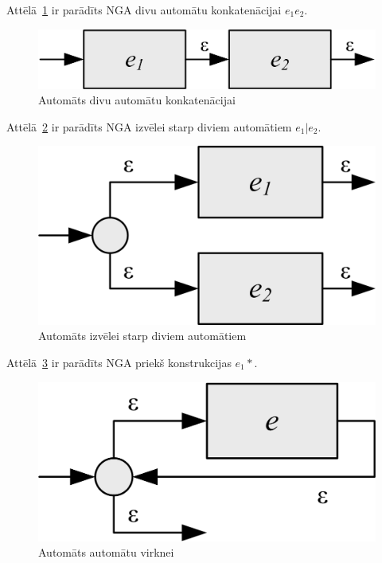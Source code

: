 Attēlā~\ref{fig:auto_sequence} ir parādīts NGA divu automātu konkatenācijai $e_1 e_2$.
\begin{figure}[H]
  \centering
    \includegraphics[scale=1.5]{pictures/auto_sequence}
  \caption{\label{fig:auto_sequence}Automāts divu automātu konkatenācijai}
\end{figure}

Attēlā~\ref{fig:auto_or} ir parādīts NGA izvēlei starp diviem automātiem $e_1 | e_2$.
\begin{figure}[H]
  \centering
    \includegraphics[scale=1.5]{pictures/auto_or}
  \caption{\label{fig:auto_or}Automāts izvēlei starp diviem automātiem}
\end{figure}

Attēlā~\ref{fig:auto_asterisk} ir parādīts NGA priekš konstrukcijas $e_1 *$.
\begin{figure}[H]
  \centering
    \includegraphics[scale=1.5]{pictures/auto_asterisk}
  \caption{\label{fig:auto_asterisk}Automāts automātu virknei}
\end{figure}

